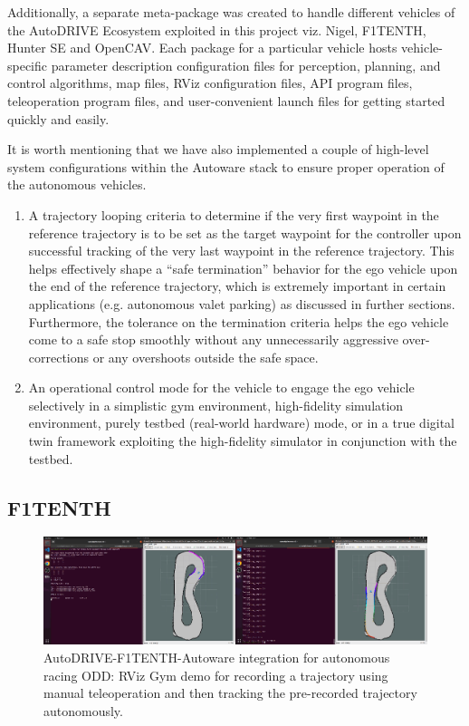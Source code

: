 Additionally, a separate meta-package was created to handle different vehicles of the AutoDRIVE Ecosystem exploited in this project viz. Nigel, F1TENTH, Hunter SE and OpenCAV. Each package for a particular vehicle hosts vehicle-specific parameter description configuration files for perception, planning, and control algorithms, map files, RViz configuration files, API program files, teleoperation program files, and user-convenient launch files for getting started quickly and easily.

It is worth mentioning that we have also implemented a couple of high-level system configurations within the Autoware stack to ensure proper operation of the autonomous vehicles.

\begin{enumerate}
    \item A trajectory looping criteria to determine if the very first waypoint in the reference trajectory is to be set as the target waypoint for the controller upon successful tracking of the very last waypoint in the reference trajectory. This helps effectively shape a “safe termination” behavior for the ego vehicle upon the end of the reference trajectory, which is extremely important in certain applications (e.g. autonomous valet parking) as discussed in further sections. Furthermore, the tolerance on the termination criteria helps the ego vehicle come to a safe stop smoothly without any unnecessarily aggressive over-corrections or any overshoots outside the safe space.
    \item An operational control mode for the vehicle to engage the ego vehicle selectively in a simplistic gym environment, high-fidelity simulation environment, purely testbed (real-world hardware) mode, or in a true digital twin framework exploiting the high-fidelity simulator in conjunction with the testbed.
\end{enumerate}

\hypertarget{F1TENTH}{%
\subsection{F1TENTH}\label{F1TENTH}}

\begin{figure}[H]
    \centering
    \includegraphics[width=\linewidth]{Figures/fig12.png}
    \caption{AutoDRIVE-F1TENTH-Autoware integration for autonomous racing ODD: RViz Gym demo for recording a trajectory using manual teleoperation and then tracking the pre-recorded trajectory autonomously.}
    \label{fig: figure12}
\end{figure}

